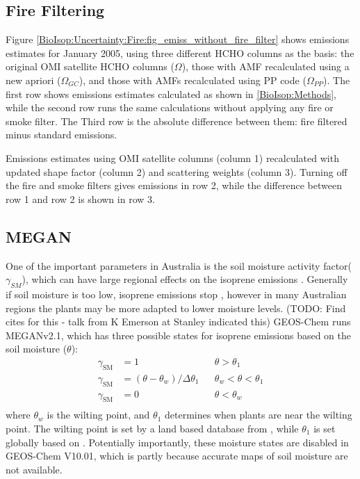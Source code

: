   \subsection{Fire Filtering}
    
    Figure \ref{BioIsop:Uncertainty:Fire:fig_emiss_without_fire_filter} shows emissions estimates for January 2005, using three different HCHO columns as the basis: the original OMI satellite HCHO columns ($\Omega$), those with AMF recalculated using a new apriori ($\Omega_{GC}$), and those with AMFs recalculated using PP code ($\Omega_{PP}$).
    The first row shows emissions estimates calculated as shown in \ref{BioIsop:Methods}, while the second row runs the same calculations without applying any fire or smoke filter.
    The Third row is the absolute difference between them: fire filtered minus standard emissions.
    
    {Emissions estimates using OMI satellite columns (column 1) recalculated with updated shape factor (column 2) and scattering weights (column 3). Turning off the fire and smoke filters gives emissions in row 2, while the difference between row 1 and row 2 is shown in row 3.}
    {\label{BioIsop:Uncertainty:Fire:fig_emiss_without_fire_filter}}
    
  
  \subsection{MEGAN}

    One of the important parameters in Australia is the soil moisture activity factor($\gamma_{SM}$), which can have large regional effects on the isoprene emissions \parencite{Sindelarova2014,Bauwens2016}.
    Generally if soil moisture is too low, isoprene emissions stop \parencite{Pegoraro2004,Niinemets2010}, however in many Australian regions the plants may be more adapted to lower moisture levels. (TODO: Find cites for this - talk from K Emerson at Stanley indicated this)
    GEOS-Chem runs MEGANv2.1, which has three possible states for isoprene emissions based on the soil moisture ($\theta$):
    \begin{align*}
    \gamma_\mathrm{SM} & = 1 && \theta > \theta_1 \\
    \gamma_\mathrm{SM} & = (\theta-\theta_w)/\Delta\theta_1  && \theta_w < \theta < \theta_1 \\
    \gamma_\mathrm{SM} & = 0 && \theta < \theta_w \\
    \end{align*}
    where $\theta_w$ is the wilting point, and $\theta_1$ determines when plants are near the wilting point.
    The wilting point is set by a land based database from \textcite{Chen2001}, while $\theta_1$ is set globally based on \textcite{Pegoraro2004}.
    Potentially importantly, these moisture states are disabled in GEOS-Chem V10.01, which is partly because accurate maps of soil moisture are not available.

